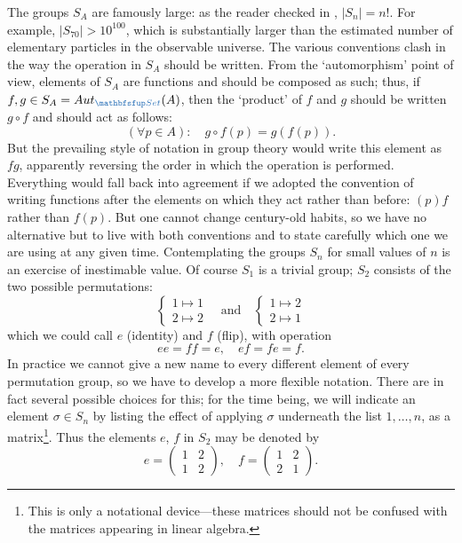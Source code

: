 The groups $S_A$ are famously large: as the reader checked in
, $|S_n| = n!$. For example,
$|S_{70}| > 10^{100}$, which is substantially larger than the
estimated number of elementary particles in the observable universe.
 The various conventions clash
in the way the operation in $S_A$ should be written. From the
`automorphism' point of view, elements of $S_A$ are functions and
should be composed as such; thus, if
$f, g \in S_A = \Aut_{\categ{Set}}(A)$, then the `product' of $f$ and
$g$ should be written $g \circ f$ and should act as follows:
\[
  (\forall p \in A) : \quad g \circ f(p) = g(f(p)).
\]
But the prevailing style of notation in group theory would write this
element as $fg$, apparently reversing the order in which the operation
is performed.  Everything would fall back into agreement if we adopted
the convention of writing functions after the elements on which they
act rather than before: $(p)f$ rather than $f(p)$. But one cannot
change century-old habits, so we have no alternative but to live with
both conventions and to state carefully which one we are using at any
given time.  Contemplating the groups $S_n$ for small values of $n$ is
an exercise of inestimable value. Of course $S_1$ is a trivial group;
$S_2$ consists of the two possible permutations:
\[
  \left\{\begin{array}{l} 1 \mapsto 1 \\ 2 \mapsto
      2 \end{array}\right.  \quad \text{and} \quad
  \left\{\begin{array}{l} 1 \mapsto 2 \\ 2 \mapsto
      1 \end{array}\right.
\]
which we could call $e$ (identity) and $f$ (flip), with operation
\[
  ee = ff = e, \quad ef = fe = f.
\]
In practice we cannot give a new name to every different element of
every permutation group, so we have to develop a more flexible
notation. There are in fact several possible choices for this; for the
time being, we will indicate an element $\sigma \in S_n$ by listing
the effect of applying $\sigma$ underneath the list $1, \ldots, n$, as
a matrix\footnote{This is only a notational device---these matrices
  should not be confused with the matrices appearing in linear
  algebra.}. Thus the elements $e$, $f$ in $S_2$ may be denoted by
\[
  e = \begin{pmatrix} 1 & 2 \\ 1 & 2 \end{pmatrix}, \quad f
  = \begin{pmatrix} 1 & 2 \\ 2 & 1 \end{pmatrix}.
\]
